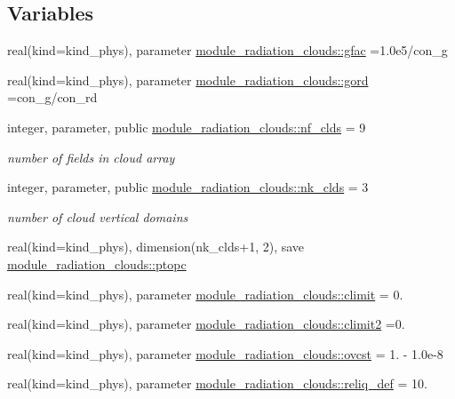 \subsection*{Variables}
\begin{DoxyCompactItemize}
\item 
real(kind=kind\+\_\+phys), parameter \hyperlink{group__module__radiation__clouds_gab4060544be25be2b0a87042fb3bd6242}{module\+\_\+radiation\+\_\+clouds\+::gfac} =1.\+0e5/con\+\_\+g
\item 
real(kind=kind\+\_\+phys), parameter \hyperlink{group__module__radiation__clouds_ga50ea21222eb91e6363e8bf1338b34a66}{module\+\_\+radiation\+\_\+clouds\+::gord} =con\+\_\+g/con\+\_\+rd
\item 
integer, parameter, public \hyperlink{group__module__radiation__clouds_ga66cf0f94619a3d865b0c593197a30576}{module\+\_\+radiation\+\_\+clouds\+::nf\+\_\+clds} = 9
\begin{DoxyCompactList}\small\item\em number of fields in cloud array \end{DoxyCompactList}\item 
integer, parameter, public \hyperlink{group__module__radiation__clouds_ga2739168b8205ee860eb8a160ea722a44}{module\+\_\+radiation\+\_\+clouds\+::nk\+\_\+clds} = 3
\begin{DoxyCompactList}\small\item\em number of cloud vertical domains \end{DoxyCompactList}\item 
real(kind=kind\+\_\+phys), dimension(nk\+\_\+clds+1, 2), save \hyperlink{group__module__radiation__clouds_ga03bc5d19cbdc84a2032c8d591ba4c96a}{module\+\_\+radiation\+\_\+clouds\+::ptopc}
\item 
real(kind=kind\+\_\+phys), parameter \hyperlink{group__module__radiation__clouds_gad4d5840310847f5bf39082114069ceb8}{module\+\_\+radiation\+\_\+clouds\+::climit} = 0.
\item 
real(kind=kind\+\_\+phys), parameter \hyperlink{group__module__radiation__clouds_ga2f6f333d39f496f623036802fc05f209}{module\+\_\+radiation\+\_\+clouds\+::climit2} =0.
\item 
real(kind=kind\+\_\+phys), parameter \hyperlink{group__module__radiation__clouds_ga5667082e13ef37593bdfcc152e3dd449}{module\+\_\+radiation\+\_\+clouds\+::ovcst} = 1. -\/ 1.\+0e-\/8
\item 
real(kind=kind\+\_\+phys), parameter \hyperlink{group__module__radiation__clouds_ga1768a85f4d8af2ad40b62ae6e6667c1e}{module\+\_\+radiation\+\_\+clouds\+::reliq\+\_\+def} = 10.

\end{DoxyCompactItemize}
